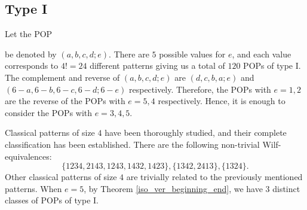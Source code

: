\documentclass[12pt, english, a4paper]{article}
\newcommand{\Av}{\mathfrak{S}}
\theoremstyle{plain}
\theoremstyle{definition}
\theoremstyle{remark}
\begin{document}
\subsection{Type I}
Let the POP  be denoted by $(a,b,c,d ;e)$. There are $5$ possible values for $e$, and each value corresponds to $4!=24$ different patterns giving us a total of $120$ POPs of type I. The complement and reverse of $(a,b,c,d;e)$ are $(d,c,b,a;e)$ and $(6-a,6-b,6-c,6-d;6-e)$ respectively.
Therefore, the POPs with $e=1,2$ are the reverse of the POPs with $e=5,4$ respectively. Hence, it is enough to consider the POPs with $e=3,4,5$.

  Classical patterns of size $4$ have been thoroughly studied, and their complete classification has been established. There are the following non-trivial Wilf-equivalences: $$\{1234, 2143, 1243, 1432, 1423\},\{1342, 2413\},\{1324\}.$$
    Other classical patterns of size $4$ are trivially related to the previously mentioned patterns. When $e=5$, by Theorem \ref{iso_ver_beginning_end}, we have $3$ distinct classes of POPs of type I.
\end{document}

